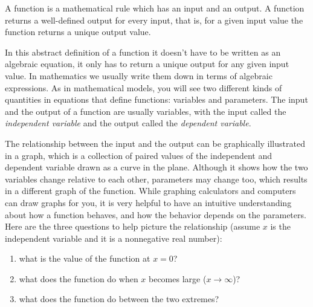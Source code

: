 \documentclass[
  letterpaper,
  DIV=11,
  numbers=noendperiod]{scrreprt}
\providecommand{\tightlist}{%
  \setlength{\itemsep}{0pt}\setlength{\parskip}{0pt}}\usepackage{longtable,booktabs,array}
\begin{document}
\begin{tcolorbox}[enhanced jigsaw, arc=.35mm, colframe=quarto-callout-note-color-frame, left=2mm, opacitybacktitle=0.6, breakable, title=\textcolor{quarto-callout-note-color}{\faInfo}\hspace{0.5em}{Definition}, toprule=.15mm, coltitle=black, bottomtitle=1mm, toptitle=1mm, colback=white, leftrule=.75mm, colbacktitle=quarto-callout-note-color!10!white, titlerule=0mm, opacityback=0, rightrule=.15mm, bottomrule=.15mm]

A function is a mathematical rule which has an input and an output. A
function returns a well-defined output for every input, that is, for a
given input value the function returns a unique output value.

\end{tcolorbox}

In this abstract definition of a function it doesn't have to be written
as an algebraic equation, it only has to return a unique output for any
given input value. In mathematics we usually write them down in terms of
algebraic expressions. As in mathematical models, you will see two
different kinds of quantities in equations that define functions:
variables and parameters. The input and the output of a function are
usually variables, with the input called the
 \emph{independent variable} and the output
called the  \emph{dependent variable}.

The relationship between the input and the output can be graphically
illustrated in a  graph, which is a collection of
paired values of the independent and dependent variable drawn as a curve
in the plane. Although it shows how the two variables change relative to
each other, parameters may change too, which results in a different
graph of the function. While graphing calculators and computers can draw
graphs for you, it is very helpful to have an intuitive understanding
about how a function behaves, and how the behavior depends on the
parameters. Here are the three questions to help picture the
relationship (assume \(x\) is the independent variable and it is a
nonnegative real number):

\begin{enumerate}
\def\labelenumi{\arabic{enumi}.}
\tightlist
\item
  what is the value of the function at \(x=0\)?
\item
  what does the function do when \(x\) becomes large (\(x \to \infty\))?
\item
  what does the function do between the two extremes?
\end{enumerate}
\end{document}
